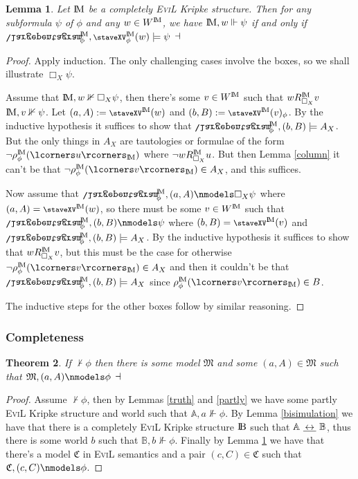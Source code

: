 \documentclass[11pt]{article}
\numberwithin{equation}{subsection}
\newtheorem{theorem}{Theorem}[subsection]
\newtheorem{lemma}[theorem]{Lemma}
\newcommand{\ipent}{\mathrel{\reflectbox{\rotatebox[origin=c]{180}{\ensuremath{\largepentagram}}}}\!\!\!}
\newcommand{\Nec}{\Box}
\newcommand{\Kill}{\textrm{\footnotesize{\staveXV}}}
\begin{document}
\begin{lemma}\label{translation}
Let $\bbM$ be a completely \textsc{EviL} Kripke structure.  Then for any subformula $\psi$ of $\phi$ and any $w \in W^\bbM$, we have $\bbM,w \Vdash \psi$ if and only if $\ipent^\bbM_\phi, \Kill_\phi^\bbM(w) \models \psi$
$\hfill\dashv$
\end{lemma}
\begin{proof}
Apply induction.  The only challenging cases involve the boxes, so we shall illustrate $\Box_X \psi$.  

Assume that $\bbM, w \nVdash \Box_X \psi$, then there's some $v \in W^\bbM$ such that $w R^\bbM_{\Box_X} v$ $\bbM, v \nVdash \psi$. Let $(a,A) := \Kill^\bbM(w)$ and $(b,B) := \Kill^\bbM(v)_\phi$. By the inductive hypothesis it suffices to show that $\ipent^\bbM_\phi,(b,B) \models A_X$.  But the only things in  $A_X$ are tautologies or formulae of the form $\neg \rho^\bbM_\phi(\lcorners u\rcorners_\bbM)$ where $\neg w R^\bbM_{\Nec_X} u$.  But then Lemma \ref{column} it can't be that $\neg \rho^\bbM_\phi(\lcorners v\rcorners_\bbM) \in A_X$, and this suffices.

Now assume that $\ipent^\bbM_\phi, (a,A) \nmodels \Box_X \psi$ where $(a,A) = \Kill^\bbM(w)$, so there must be some $v \in W^\bbM$ such that $\ipent^\bbM_\phi, (b,B) \nmodels  \psi$ where $(b,B) = \Kill^\bbM(v)$ and $\ipent^\bbM_\phi, (b,B) \models  A_X$.  By the inductive hypothesis it suffices to show that $w R^\bbM_{\Nec_X} v$, but this must be the case for otherwise $\neg \rho^\bbM_\phi(\lcorners v\rcorners_\bbM) \in A_X$ and then it couldn't be that $\ipent^\bbM_\phi, (b,B) \models  A_X$ since $\rho^\bbM_\phi(\lcorners v\rcorners_\bbM) \in B$.

The inductive steps for the other boxes follow by similar reasoning.
\end{proof}

\subsubsection{Completeness}

\begin{theorem}
If $\nvdash \phi$ then there is some model $\mathfrak{M}$ and some $(a,A) \in \mathfrak{M}$ such that $\mathfrak{M},(a,A) \nmodels \phi$ $\hfill\dashv$
\end{theorem}
\begin{proof}
	Assume $\nvdash \phi$, then by Lemmas \ref{truth} and \ref{partly} we have some partly \textsc{EviL} Kripke 
	structure and world such that $\mathbb{A},a \nVdash \phi$.  By Lemma \ref{bisimulation} we have that there is a 
	completely \textsc{EviL} Kripke structure $\bbB$ such that $\mathbb{A}\ \underline{\,\leftrightarrow\,}\ \mathbb{B}$, thus there is some world $b$ such that $\mathbb{B},b \nVdash \phi$.  
	Finally by Lemma \ref{translation} we have that there's a model $\mathfrak{C}$ in \textsc{EviL} semantics and a pair $(c,C) \in \mathfrak{C}$ such that $\mathfrak{C},(c,C) \nmodels \phi$.
\end{proof}
\end{document}
